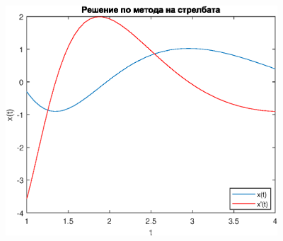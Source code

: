 \documentclass[a4paper,fleqn,12pt]{article}
\begin{document}
\begin{center}
\includegraphics [width=4in]{fourthTask_01.eps}
\end{center}
\end{document}

